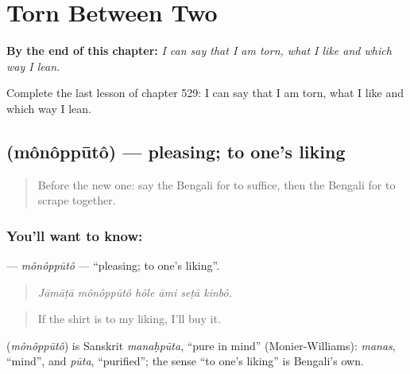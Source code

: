 
\chapter{Torn Between Two}
\label{ch:bn-torn-between-two}

\begin{chapteropening}
\textbf{By the end of this chapter:} \emph{I can say that I am torn, what I like and which way I lean.}

Complete the last lesson of chapter 529: I can say that I am torn, what I like and which way I lean.
\end{chapteropening}

\section[\texorpdfstring{\bn{মনঃপূত} (mônôppūtô)}{মনঃপূত (mônôppūtô)}]{ (mônôppūtô) — pleasing; to one's liking}

\label{lesson:BN-C529-monopputo}



\begin{quote}
Before the new one: say the Bengali for to suffice, then the Bengali for to scrape together.
\end{quote}

\subsection*{You'll want to know: }
\textbf{} — \emph{mônôppūtô} — \textquotedblleft{}pleasing; to one's liking\textquotedblright{}.

\begin{quote}
     
\end{quote}

\begin{quote}
\emph{Jāmāṭā mônôppūtô hôle āmi seṭā kinbô.}
\end{quote}

\begin{quote}
If the shirt is to my liking, I'll buy it.
\end{quote}

\begin{cousinweb}
\textbf{} (\emph{mônôppūtô}) is Sanskrit \emph{manaḥpūta}, \textquotedblleft{}pure in mind\textquotedblright{} (Monier-Williams): \emph{manas}, \textquotedblleft{}mind\textquotedblright{}, and \emph{pūta}, \textquotedblleft{}purified\textquotedblright{}; the sense \textquotedblleft{}to one's liking\textquotedblright{} is Bengali's own.
\end{cousinweb}

